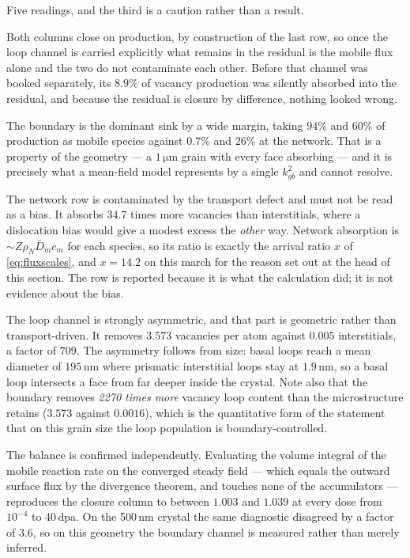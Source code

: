 Five readings, and the third is a caution rather than a result.

Both columns close on production, by construction of the last row, so once the
loop channel is carried explicitly what remains in the residual is the mobile
flux alone and the two do not contaminate each other. Before that channel was
booked separately, its $8.9\%$ of vacancy production was silently absorbed into
the residual, and because the residual is closure by difference, nothing looked
wrong.

The boundary is the dominant sink by a wide margin, taking $94\%$ and $60\%$ of
production as mobile species against $0.7\%$ and $26\%$ at the network. That is
a property of the geometry --- a $1\,\mathrm{\mu m}$ grain with every face
absorbing --- and it is precisely what a mean-field model represents by a single
$k^{2}_{gb}$ and cannot resolve.

The network row is contaminated by the transport defect and must not be read as
a bias. It absorbs $34.7$ times more vacancies than interstitials, where a
dislocation bias would give a modest excess the \emph{other} way. Network
absorption is $\sim Z\rho_N\bar D_m c_m$ for each species, so its ratio is
exactly the arrival ratio $x$ of \cref{eq:fluxscales}, and $x=14.2$ on this
march for the reason set out at the head of this section. The row is reported
because it is what the calculation did; it is not evidence about the bias.

The loop channel is strongly asymmetric, and that part is geometric rather than
transport-driven. It removes $3.573$ vacancies per atom against $0.005$
interstitials, a factor of $709$. The asymmetry follows from size: basal loops
reach a mean diameter of $195\,$nm where prismatic interstitial loops stay at
$1.9\,$nm, so a basal loop intersects a face from far deeper inside the crystal.
Note also that the boundary removes \emph{2270 times more} vacancy loop content
than the microstructure retains ($3.573$ against $0.0016$), which is the
quantitative form of the statement that on this grain size the loop population
is boundary-controlled.

The balance is confirmed independently. Evaluating the volume integral of the
mobile reaction rate on the converged steady field --- which equals the outward
surface flux by the divergence theorem, and touches none of the accumulators ---
reproduces the closure column to between $1.003$ and $1.039$ at every dose from
$10^{-4}$ to 40\,dpa. On the 500\,nm crystal the same diagnostic disagreed by a
factor of $3.6$, so on this geometry the boundary channel is measured rather
than merely inferred.

